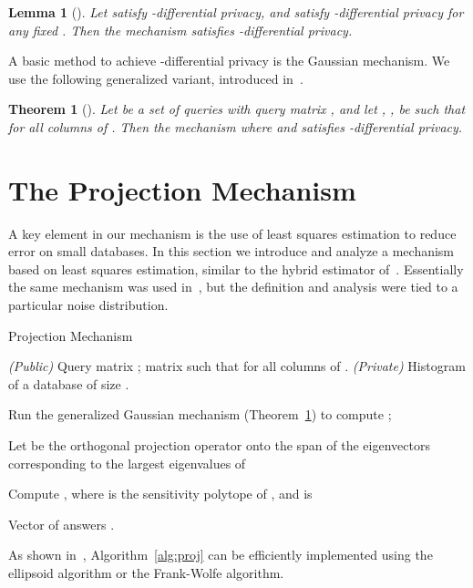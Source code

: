 \documentclass{article}
\newtheorem{theorem}{Theorem}[section]
\newtheorem{lemma}{Lemma}[theorem]
\begin{document}
\begin{lemma}[\cite{DMNS,odo}]
  \label{lm:simple-composition}
  Let  satisfy -differential privacy, and
   satisfy -differential
  privacy for any fixed . Then the mechanism
   satisfies
  -differential privacy.
\end{lemma}

A basic method to achieve -differential privacy is the
Gaussian mechanism. We  use the following generalized variant,
introduced in~\cite{NTZ}.

\begin{theorem}[\cite{DN,DworkN04,DMNS,NTZ}]\label{thm:gaussian}
  Let  be a set of queries with query matrix , and let
  , , be such that
   for all columns  of . Then the
  mechanism  where  and  satisfies -differential privacy.
\end{theorem}

\section{The Projection Mechanism}

A key element in our mechanism is the use
of least squares estimation to reduce error on small databases. In this section we
introduce and analyze a mechanism based on least squares estimation,
similar to the hybrid estimator of~\cite{Zhang13-hybrid}. Essentially
the same mechanism was used in~\cite{NTZ}, but the definition and
analysis were tied to a particular noise distribution.

\begin{algorithm}
  \caption{Projection Mechanism    }\label{alg:proj}
  \begin{algorithmic}[1]
    \REQUIRE \emph{(Public)} Query matrix ; matrix  such that  for all columns  of .
    \REQUIRE \emph{(Private)} Histogram  of a database of size
    .
    
    \STATE Run the generalized Gaussian mechanism
    (Theorem~\ref{thm:gaussian}) to compute ;

    \STATE Let  be the orthogonal projection operator onto the
    span of the eigenvectors corresponding to the   largest eigenvalues of 

    \STATE Compute , where  is the sensitivity
    polytope of , and  is
    

    \ENSURE  Vector of answers .
  \end{algorithmic}
\end{algorithm}

As shown in~\cite{NTZ,conjunctions}, Algorithm~\ref{alg:proj} can be
efficiently implemented using the ellipsoid algorithm or the
Frank-Wolfe algorithm.
\end{document}
